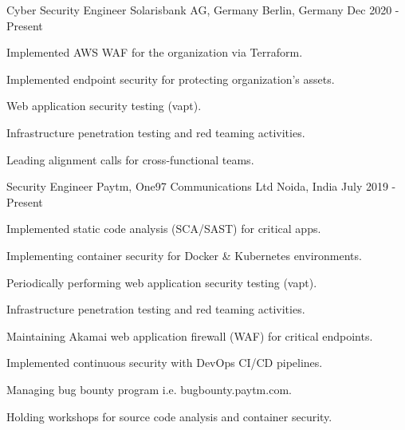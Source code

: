 
\begin{cventries}

\cventry
    {Cyber Security Engineer} %
    {Solarisbank AG, Germany} %
    {Berlin, Germany} %
    {Dec 2020 - Present} %
    {
      \begin{cvitems} %
        \item {Implemented AWS WAF for the organization via Terraform.}
        \item {Implemented endpoint security for protecting organization's assets.}
        \item {Web application security testing (vapt).}
        \item {Infrastructure penetration testing and red teaming activities.}
        \item {Leading alignment calls for cross-functional teams.}
      \end{cvitems}
    }

  \cventry
    {Security Engineer} %
    {Paytm, One97 Communications Ltd} %
    {Noida, India} %
    {July 2019 - Present} %
    {
      \begin{cvitems} %
        \item {Implemented static code analysis (SCA/SAST) for critical apps.}
        \item {Implementing container security for Docker \& Kubernetes environments.}
        \item {Periodically performing web application security testing (vapt).}
        \item {Infrastructure penetration testing and red teaming activities.}
        \item {Maintaining Akamai web application firewall (WAF) for critical endpoints.}
        \item {Implemented continuous security with DevOps CI/CD pipelines.}
        \item {Managing bug bounty program i.e. bugbounty.paytm.com.}
        \item {Holding workshops for source code analysis and container security.}
      \end{cvitems}
    }


\end{cventries}
